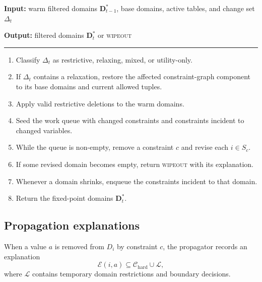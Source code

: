 \documentclass[pdflatex,sn-mathphys-num,iicol,oneside]{sn-jnl}
\newcommand{\algin}[1]{\textbf{Input:} #1\par}
\newcommand{\algout}[1]{%
  \textbf{Output:} #1\par
  \vspace{2pt}\hrule\vspace{3pt}%
}
\newenvironment{algsteps}
  {\begin{enumerate}[
      leftmargin=1.8em,
      itemsep=1pt,
      parsep=0pt,
      topsep=2pt,
      label=\arabic*:
    ]}
  {\end{enumerate}}
\begin{document}
\begin{algorithm}[t]
\caption{Incremental GAC with restoration after relaxation}
\label{alg:incgac}
\small

\algin{
warm filtered domains $\bm{D}^{*}_{t-1}$,
base domains, active tables, and change set $\Delta_t$
}

\algout{
filtered domains $\bm{D}^{*}_{t}$ or \textsc{wipeout}
}

\begin{algsteps}

\item Classify $\Delta_t$ as restrictive, relaxing, mixed, or
utility-only.

\item If $\Delta_t$ contains a relaxation, restore the affected
constraint-graph component to its base domains and current allowed
tuples.

\item Apply valid restrictive deletions to the warm domains.

\item Seed the work queue with changed constraints and constraints
incident to changed variables.

\item While the queue is non-empty, remove a constraint $c$ and revise
each $i\in S_c$.

\item If some revised domain becomes empty, return \textsc{wipeout}
with its explanation.

\item Whenever a domain shrinks, enqueue the constraints incident to
that domain.

\item Return the fixed-point domains $\bm{D}^{*}_{t}$.

\end{algsteps}
\end{algorithm}

\subsection{Propagation explanations}
\label{sec:explanations}

When a value $a$ is removed from $D_i$ by constraint $c$, the
propagator records an explanation
\begin{equation}
\mathcal{E}(i,a)
\subseteq
\mathcal{C}_{\mathrm{hard}}
\cup
\mathcal{L},
\end{equation}
where $\mathcal{L}$ contains temporary domain restrictions and
boundary decisions.
\end{document}
